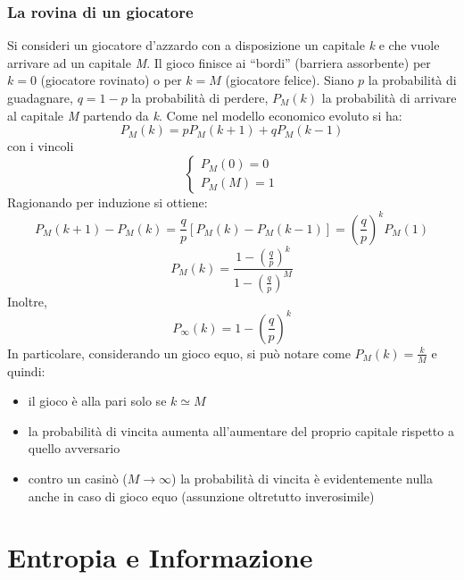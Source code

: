 \documentclass[12pt, a4paper]{book}
\theoremstyle{theorem}
\begin{document}
			\subsection{La rovina di un giocatore}
				Si consideri un giocatore d'azzardo con a disposizione un capitale \textit{k} e che vuole arrivare ad un capitale \textit{M}.
				Il gioco finisce ai ``bordi'' (barriera assorbente) per $k=0$ (giocatore rovinato) o per $k=M$ (giocatore felice).
				Siano $p$ la probabilità di guadagnare, $q=1-p$ la probabilità di perdere, $P_M(k)$ la probabilità di arrivare al capitale \textit{M} partendo da \textit{k}.
				Come nel modello economico evoluto si ha:
				\begin{equation*}
					P_M(k)=pP_M(k+1)+qP_M(k-1)
				\end{equation*}
				con i vincoli
				\begin{equation*}
					\begin{cases}
						P_M(0)=0\\
						P_M(M)=1
					\end{cases}
				\end{equation*}
				Ragionando per induzione si ottiene:
				\begin{equation*}
					P_M(k+1)-P_M(k)=\frac{q}{p}\left[P_M(k)-P_M(k-1)\right]=\left(\frac{q}{p}\right)^kP_M(1)
				\end{equation*}
				\begin{equation}
					P_M(k)=\frac{1-\left(\frac{q}{p}\right)^k}{1-\left(\frac{q}{p}\right)^M}
				\end{equation}
				Inoltre,
				\begin{equation}
					P_\infty(k)=1-\left(\frac{q}{p}\right)^k
				\end{equation}
				In particolare, considerando un gioco equo, si può notare come $P_M(k)=\frac{k}{M}$ e quindi:
				\begin{itemize}
					\item il gioco è alla pari solo se $k\simeq M$
					\item la probabilità di vincita aumenta all'aumentare del proprio capitale rispetto a quello avversario
					\item contro un casinò ($M\to\infty$) la probabilità di vincita è evidentemente nulla anche in caso di gioco equo (assunzione oltretutto inverosimile)
				\end{itemize}
	
	\chapter{Entropia e Informazione} %
		
\end{document}

